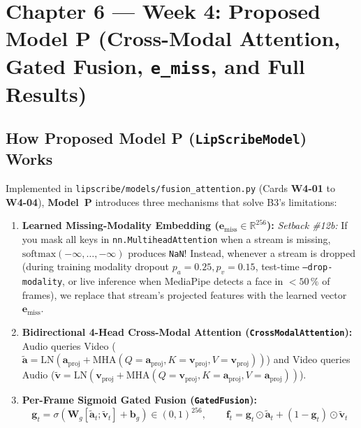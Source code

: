 \documentclass[11pt,a4paper]{article}
\newcommand{\code}[1]{\texttt{\small #1}}
\begin{document}
\section{Chapter 6 --- Week 4: Proposed Model P (Cross-Modal Attention, Gated Fusion, \code{e\_miss}, and Full Results)}

\subsection{How Proposed Model P (\code{LipScribeModel}) Works}
Implemented in \code{lipscribe/models/fusion\_attention.py} (Cards \textbf{W4-01} to \textbf{W4-04}), \textbf{Model~P} introduces three mechanisms that solve B3's limitations:
\begin{enumerate}
  \item \textbf{Learned Missing-Modality Embedding ($\mathbf{e}_{\text{miss}} \in \mathbb{R}^{256}$):}
    \emph{Setback \#12b:} If you mask all keys in \code{nn.MultiheadAttention} when a stream is missing, $\text{softmax}(-\infty,\dots,-\infty)$ produces \code{NaN}! Instead, whenever a stream is dropped (during training modality dropout $p_a=0.25, p_v=0.15$, test-time \code{--drop-modality}, or live inference when MediaPipe detects a face in $< 50\,\%$ of frames), we replace that stream's projected features with the learned vector $\mathbf{e}_{\text{miss}}$.
  \item \textbf{Bidirectional 4-Head Cross-Modal Attention (\code{CrossModalAttention}):}
    Audio queries Video ($\tilde{\mathbf{a}} = \text{LN}(\mathbf{a}_{\text{proj}} + \text{MHA}(Q=\mathbf{a}_{\text{proj}}, K=\mathbf{v}_{\text{proj}}, V=\mathbf{v}_{\text{proj}}))$) and Video queries Audio ($\tilde{\mathbf{v}} = \text{LN}(\mathbf{v}_{\text{proj}} + \text{MHA}(Q=\mathbf{v}_{\text{proj}}, K=\mathbf{a}_{\text{proj}}, V=\mathbf{a}_{\text{proj}}))$).
  \item \textbf{Per-Frame Sigmoid Gated Fusion (\code{GatedFusion}):}
    $$\mathbf{g}_t = \sigma\!\left(\mathbf{W}_g [\tilde{\mathbf{a}}_t; \tilde{\mathbf{v}}_t] + \mathbf{b}_g\right) \in (0, 1)^{256}, \qquad \mathbf{f}_t = \mathbf{g}_t \odot \tilde{\mathbf{a}}_t + (1 - \mathbf{g}_t) \odot \tilde{\mathbf{v}}_t$$
\end{enumerate}
\end{document}
